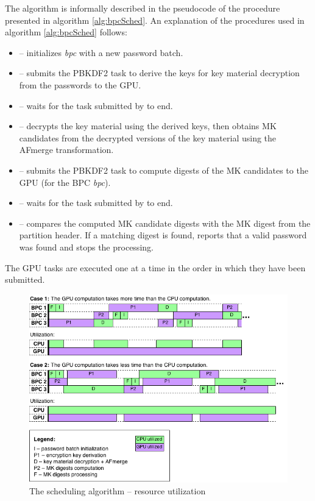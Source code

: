\documentclass[12pt,oneside]{fithesis2}
\begin{document}
      The algorithm is informally described in the pseudocode of the  procedure presented in algorithm \ref{alg:bpcSched}. An explanation of the procedures used in algorithm \ref{alg:bpcSched} follows:
      \begin{itemize}
        \item {} -- initializes \emph{bpc} with a new password batch.
        \item {} -- submits the PBKDF2 task to derive the keys for key material decryption from the passwords to the GPU.
        \item {} -- waits for the task submitted by  to end.
        \item {} -- decrypts the key material using the derived keys, then obtains MK candidates from the decrypted versions of the key material using the AFmerge transformation.
        \item {} -- submits the PBKDF2 task to compute digests of the MK candidates to the GPU (for the BPC \emph{bpc}).
        \item {} -- waits for the task submitted by  to end.
        \item {} -- compares the computed MK candidate digests with the MK digest from the partition header. If a matching digest is found, reports that a valid password was found and stops the processing.
      \end{itemize}
      
      The GPU tasks are executed one at a time in the order in which they have been submitted.
      
      \begin{figure}
        \centering
        \includegraphics[width=\linewidth]{images/scheduling.png}
        \caption{The scheduling algorithm -- resource utilization}
        \label{fig:scheduling}
      \end{figure}
      
\end{document}

